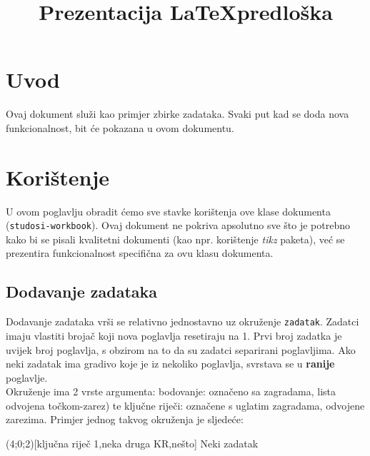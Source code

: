\documentclass{studosi-workbook}
\begin{document}
    \title{Prezentacija \LaTeX \space predloška}
    \maketitle



    \tableofcontents



    \chapter{Uvod}\label{ch:uvod}
    Ovaj dokument služi kao primjer zbirke zadataka. Svaki put kad se doda nova
    funkcionalnost, bit će pokazana u ovom dokumentu.



    \chapter{Korištenje}\label{ch:koristenje}
    U ovom poglavlju obradit ćemo sve stavke korištenja ove klase dokumenta \\
    (\texttt{studosi-workbook}). Ovaj dokument ne pokriva apsolutno sve što je potrebno
    kako bi se pisali kvalitetni dokumenti (kao npr. korištenje \textit{tikz} paketa),
    već se prezentira funkcionalnost specifična za ovu klasu dokumenta.


    \section{Dodavanje zadataka}\label{ch:dodavanje-zadataka}
    Dodavanje zadataka vrši se relativno jednostavno uz okruženje \texttt{zadatak}. Zadatci imaju vlastiti brojač koji nova poglavlja resetiraju na 1. Prvi broj zadatka je uvijek broj poglavlja, s obzirom na to da su zadatci separirani poglavljima. Ako neki zadatak ima gradivo koje je iz nekoliko poglavlja, svrstava se u \textbf{ranije} poglavlje. \\
    
    Okruženje ima 2 vrste argumenta: bodovanje: označeno sa zagradama, lista odvojena točkom-zarez) te ključne riječi: označene s uglatim zagradama, odvojene zarezima. Primjer jednog takvog okruženja je sljedeće:

    \begin{kod}
    \begin{zadatak}(4;0;2)[ključna riječ 1,neka druga KR,nešto]
        Neki zadatak
    \end{zadatak}
    \end{kod}
\end{document}
